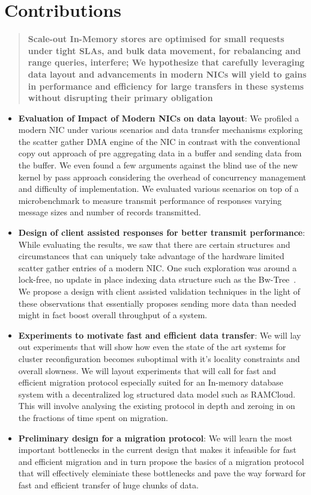 \section{Contributions}

\blockquote{\textbf{Scale-out In-Memory stores are optimised for small requests
under tight SLAs, and bulk data movement, for rebalancing and range queries, interfere;
We hypothesize that carefully leveraging data layout and advancements in modern NICs
will yield to gains in performance and efficiency for large transfers in these systems
without disrupting their primary obligation}}



\begin{itemize}
\item{\textbf{Evaluation of Impact of Modern NICs on data layout}}: We profiled a modern NIC under various 
scenarios and data transfer mechanisms exploring the scatter gather DMA engine of the NIC in contrast
with the conventional copy out approach of pre aggregating data in a buffer and sending data from the buffer.
We even found a few arguments against the blind use of the new kernel by pass approach considering the overhead
of concurrency management and difficulty of implementation. We evaluated various scenarios on top of a
microbenchmark to measure transmit performance of responses varying message sizes and number of records
transmitted.
\item{\textbf{Design of client assisted responses for better transmit performance}}: While evaluating the results,
we saw that there are certain structures and circumstances that can uniquely take advantage of the hardware limited 
scatter gather entries of a modern NIC. One such exploration was around a lock-free, no update in place 
indexing data structure such as the Bw-Tree~\cite{bw-tree}. We propose a design with client assisted 
validation techniques in the light of these observations that essentially proposes sending more data than 
needed might in fact boost overall throughput of a system.
\item{\textbf{Experiments to motivate fast and efficient data transfer}}: We will lay out experiments that will 
show how even the state of the art systems for cluster reconfiguration becomes suboptimal with it's locality
constraints and overall slowness. We will layout experiments that will call for fast and efficient migration protocol
especially suited for an In-memory database system with a decentralized log structured data model such as RAMCloud.
This will involve analysing the existing protocol in depth and zeroing in on the fractions of time spent on migration.
\item{\textbf{Preliminary design for a migration protocol}}: We will learn the most important bottlenecks in the current design
that makes it infeasible for fast and efficient migration and in turn propose the basics of a migration protocol that 
will effectively eleminiate these bottlenecks and pave the way forward for fast and efficient transfer of huge chunks of data.
\end{itemize}

